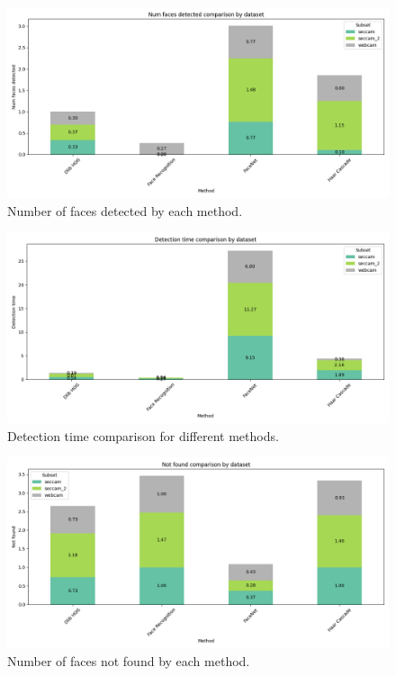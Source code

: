 \begin{figure}[ht!]
    \centering
    \includegraphics[width=\textwidth]{../Files/Num faces detected.png}
    \caption{Number of faces detected by each method.}
    \label{fig:num-faces-detected}
\end{figure}

\begin{figure}[ht!]
    \centering
    \includegraphics[width=\textwidth]{../Files/Detection time.png}
    \caption{Detection time comparison for different methods.}
    \label{fig:detection-time}
\end{figure}

\begin{figure}[ht!]
    \centering
    \includegraphics[width=\textwidth]{../Files/Not found.png}
    \caption{Number of faces not found by each method.}
    \label{fig:not-found}
\end{figure}

